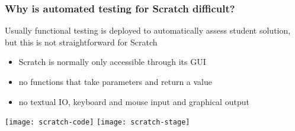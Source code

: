 \begin{frame}
\end{frame}

\begin{frame}\frametitle{Why is automated testing for Scratch difficult?}
    Usually functional testing is deployed to automatically assess student solution,
    but this is not straightforward for Scratch
    \begin{itemize}
        \item Scratch is normally only accessible through its GUI
        \item no functions that take parameters and return a value
        \item no textual IO, keyboard and mouse input and graphical output
    \end{itemize}

    \bigskip

    \centering
    \texttt{[image: scratch-code]}
    \hspace{1em}
    \texttt{[image: scratch-stage]}
\end{frame}

\begin{frame}
\end{frame}

